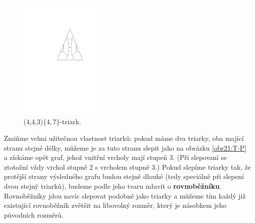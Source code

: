 \begin{figure}[h!]\centering
\includegraphics[height=60mm]{../img/triarc}
\caption{(4,4,3)$ \lbrace 4,7\rbrace $-triark.}
\label{obr03:triark}
\end{figure}

Zmiňme velmi užitečnou vlastnost triarků: pokud máme dva triarky, oba mající stranu stejné délky, můžeme je za tuto stranu slepit jako na obrázku \ref{obr21:T-P} a získáme opět graf, jehož vnitřní vrcholy mají stupeň 3. (Při slepovaní se ztotožní vždy vrchol stupně 2 s vrcholem stupně 3.) Pokud slepíme triarky tak, že protější strany výsledného grafu budou stejně dlouhé (tedy speciálně při slepení dvou stejný triarků), budeme podle jeho tvaru mluvit o \textbf{rovnoběžníku}. Rovnoběžníky jdou navíc slepovat podobně jako triarky a můžeme tím každý již existující rovnoběžník zvětšit na libovolný rozměr, který je násobkem jeho původních rozměrů.


